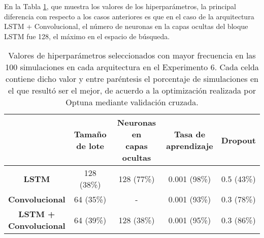 \documentclass[../../main.tex]{subfiles}
\begin{document}
En la Tabla \ref{tab:hyperparams_exp6}, que muestra los valores de los hiperparámetros,
la principal diferencia con respecto a los casos anteriores es que en el caso de la
arquitectura LSTM + Convolucional, el número de neuronas en la capas ocultas del bloque LSTM
fue 128, el máximo en el espacio de búsqueda.

\begin{table}[H]
    \centering
    \renewcommand{\arraystretch}{1.2}
    \begin{tabular}{|c|c|c|c|c|}
        \hline
            & \makecell{\textbf{Tamaño}\\\textbf{de lote}}
            & \makecell{\textbf{Neuronas en}\\\textbf{capas ocultas}}
            & \makecell{\textbf{Tasa de}\\\textbf{aprendizaje}}
            & \textbf{Dropout} \\ \hline\hline
        \textbf{LSTM}
            & 128 (38\%) & 128 (77\%) & 0.001 (98\%) & 0.5 (43\%) \\ \hline
        \textbf{Convolucional}
            & 64 (35\%) & -           & 0.001 (93\%) & 0.3 (78\%) \\ \hline
        \makecell{\textbf{LSTM +}\\\textbf{Convolucional}}
            & 64 (39\%) & 128 (38\%)  & 0.001 (95\%) & 0.3 (86\%) \\
        \hline
    \end{tabular}
    \caption{Valores de hiperparámetros seleccionados con mayor frecuencia en las 100
    simulaciones en cada arquitectura en el Experimento 6. Cada celda contiene dicho valor
    y entre paréntesis el porcentaje de simulaciones en el que resultó ser el mejor, de
    acuerdo a la optimización realizada por Optuna mediante validación cruzada.}
    \label{tab:hyperparams_exp6}
\end{table}
\end{document}
